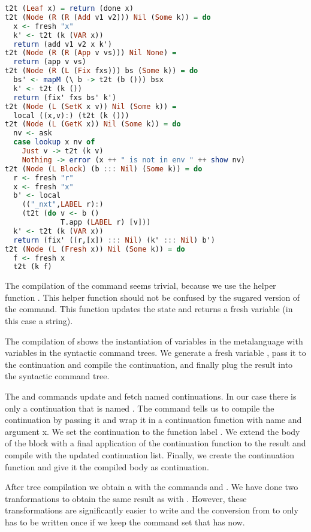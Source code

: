 \begin{lstlisting}[language=Haskell]
t2t (Leaf x) = return (done x)
t2t (Node (R (R (Add v1 v2))) Nil (Some k)) = do
  x <- fresh "x"
  k' <- t2t (k (VAR x))
  return (add v1 v2 x k')
t2t (Node (R (R (App v vs))) Nil None) =
  return (app v vs)
t2t (Node (R (L (Fix fxs))) bs (Some k)) = do
  bs' <- mapM (\ b -> t2t (b ())) bsx
  k' <- t2t (k ())
  return (fix' fxs bs' k')
t2t (Node (L (SetK x v)) Nil (Some k)) =
  local ((x,v):) (t2t (k ()))
t2t (Node (L (GetK x)) Nil (Some k)) = do
  nv <- ask
  case lookup x nv of
    Just v -> t2t (k v)
    Nothing -> error (x ++ " is not in env " ++ show nv)
t2t (Node (L Block) (b ::: Nil) (Some k)) = do
  r <- fresh "r"
  x <- fresh "x"
  b' <- local
    (("_nxt",LABEL r):)
    (t2t (do v <- b ()
             T.app (LABEL r) [v]))
  k' <- t2t (k (VAR x))
  return (fix' ((r,[x]) ::: Nil) (k' ::: Nil) b')
t2t (Node (L (Fresh x)) Nil (Some k)) = do
  f <- fresh x
  t2t (k f)
\end{lstlisting}

The compilation of the  command seems trivial, because we use the helper function . This helper function should not be confused by the sugared version of the  command. This function updates the state and returns a fresh variable (in this case a string).

The compilation of  shows the instantiation of variables in the metalanguage with variables in the syntactic command trees. We generate a fresh variable , pass it to the continuation and compile the continuation, and finally plug the result into the syntactic command tree.

The  and  commands update and fetch named continuations. In our case there is only a continuation that is named . The  command tells us to compile the continuation  by passing it  and wrap it in a continuation function with name  and argument {x}. We set the continuation  to the function label . We extend the body of the block with a final application of the continuation function  to the result  and compile with the updated continuation list. Finally, we create the continuation function and give it the compiled body  as continuation.

After tree compilation we obtain a  with the commands  and . We have done two tranformations to obtain the same result as with . However, these transformations are significantly easier to write and the conversion from  to  only has to be written once if we keep the command set that  has now.

